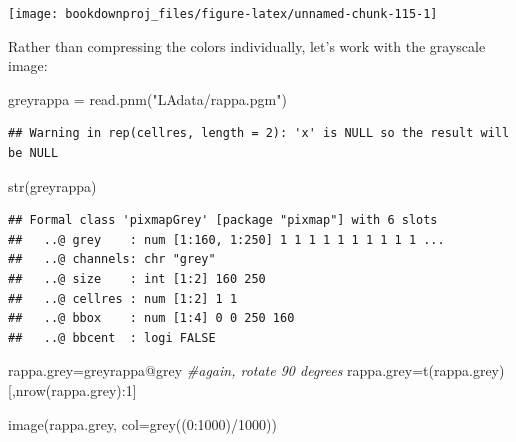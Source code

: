 \documentclass[
]{article}
\newenvironment{Shaded}{\begin{snugshade}}{\end{snugshade}}
\newcommand{\AttributeTok}[1]{\textcolor[rgb]{0.77,0.63,0.00}{#1}}
\newcommand{\CommentTok}[1]{\textcolor[rgb]{0.56,0.35,0.01}{\textit{#1}}}
\newcommand{\DecValTok}[1]{\textcolor[rgb]{0.00,0.00,0.81}{#1}}
\newcommand{\FunctionTok}[1]{\textcolor[rgb]{0.00,0.00,0.00}{#1}}
\newcommand{\NormalTok}[1]{#1}
\newcommand{\OtherTok}[1]{\textcolor[rgb]{0.56,0.35,0.01}{#1}}
\newcommand{\SpecialCharTok}[1]{\textcolor[rgb]{0.00,0.00,0.00}{#1}}
\newcommand{\StringTok}[1]{\textcolor[rgb]{0.31,0.60,0.02}{#1}}
\theoremstyle{definition}
\theoremstyle{definition}
\theoremstyle{definition}
\theoremstyle{definition}
\theoremstyle{remark}
\begin{document}
\begin{center}\texttt{[image: bookdownproj\_files/figure-latex/unnamed-chunk-115-1]} \end{center}

Rather than compressing the colors individually, let's work with the grayscale image:

\begin{Shaded}
\begin{Highlighting}[]
\NormalTok{greyrappa }\OtherTok{=} \FunctionTok{read.pnm}\NormalTok{(}\StringTok{"LAdata/rappa.pgm"}\NormalTok{)}
\end{Highlighting}
\end{Shaded}

\begin{verbatim}
## Warning in rep(cellres, length = 2): 'x' is NULL so the result will be NULL
\end{verbatim}

\begin{Shaded}
\begin{Highlighting}[]
\FunctionTok{str}\NormalTok{(greyrappa)}
\end{Highlighting}
\end{Shaded}

\begin{verbatim}
## Formal class 'pixmapGrey' [package "pixmap"] with 6 slots
##   ..@ grey    : num [1:160, 1:250] 1 1 1 1 1 1 1 1 1 1 ...
##   ..@ channels: chr "grey"
##   ..@ size    : int [1:2] 160 250
##   ..@ cellres : num [1:2] 1 1
##   ..@ bbox    : num [1:4] 0 0 250 160
##   ..@ bbcent  : logi FALSE
\end{verbatim}

\begin{Shaded}
\begin{Highlighting}[]
\NormalTok{rappa.grey}\OtherTok{=}\NormalTok{greyrappa}\SpecialCharTok{@}\NormalTok{grey}
\CommentTok{\#again, rotate 90 degrees}
\NormalTok{rappa.grey}\OtherTok{=}\FunctionTok{t}\NormalTok{(rappa.grey)[,}\FunctionTok{nrow}\NormalTok{(rappa.grey)}\SpecialCharTok{:}\DecValTok{1}\NormalTok{]}
\end{Highlighting}
\end{Shaded}

\begin{Shaded}
\begin{Highlighting}[]
\FunctionTok{image}\NormalTok{(rappa.grey, }\AttributeTok{col=}\FunctionTok{grey}\NormalTok{((}\DecValTok{0}\SpecialCharTok{:}\DecValTok{1000}\NormalTok{)}\SpecialCharTok{/}\DecValTok{1000}\NormalTok{))}
\end{Highlighting}
\end{Shaded}
\end{document}

